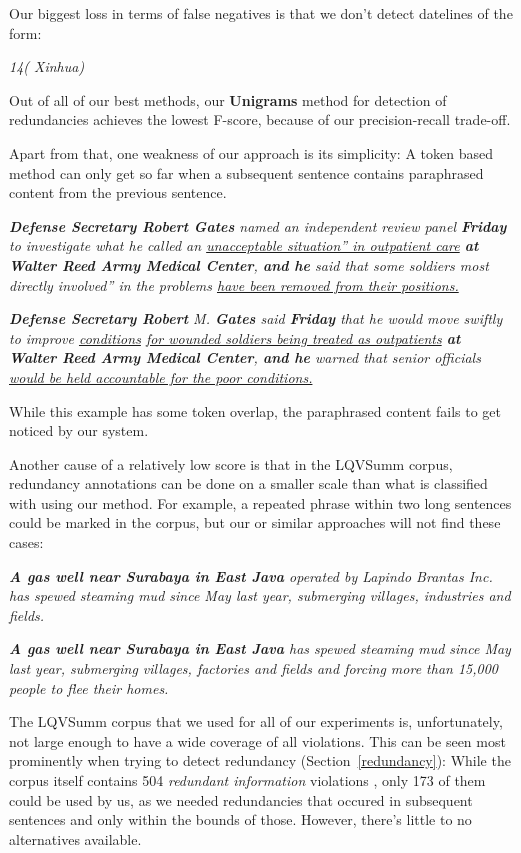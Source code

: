 \documentclass[a4paper,10pt]{scrartcl}
\theoremstyle{style}
\begin{document}

Our biggest loss in terms of false negatives is that we don't detect datelines of the form:

\quad\textit{14( Xinhua)}

Out of all of our best methods, our \textbf{Unigrams} method for detection of redundancies achieves the lowest F-score, because of our precision-recall trade-off.

Apart from that, one weakness of our approach is its simplicity: A token based method can only get so far when a subsequent sentence contains paraphrased content from the previous sentence.

\quad\textit{\textbf{Defense Secretary Robert Gates} named an independent review panel \textbf{Friday} to investigate what he called an \underline{unacceptable situation'' in outpatient care} \textbf{at Walter Reed Army Medical Center}, \textbf{and he} said that some soldiers most directly involved'' in the problems \underline{have been removed from their positions.}}

\quad\textit{\textbf{Defense Secretary Robert} M. \textbf{Gates} said \textbf{Friday} that he would move swiftly to improve \underline{conditions} \underline{for wounded soldiers being treated as outpatients} \textbf{at Walter Reed Army Medical Center}, \textbf{and he} warned that senior officials \underline{would be held accountable for the poor conditions.}}

While this example has some token overlap, the paraphrased content fails to get noticed by our system.

Another cause of a relatively low score is that in the LQVSumm corpus, redundancy annotations can be done on a smaller scale than what is classified with using our method. For example, a repeated phrase within two long sentences could be marked in the corpus, but our or similar approaches will not find these cases:

\quad\textit{\textbf{A gas well near Surabaya in East Java} operated by Lapindo Brantas Inc. has spewed steaming mud since May last year, submerging villages, industries and fields.}

\quad\textit{\textbf{A gas well near Surabaya in East Java} has spewed steaming mud since May last year, submerging villages, factories and fields and forcing more than 15,000 people to flee their homes.}

The LQVSumm corpus that we used for all of our experiments is, unfortunately, not large enough to have a wide coverage of all violations. This can be seen most prominently when trying to detect redundancy (Section~\ref{redundancy}): While the corpus itself contains 504 \textit{redundant information} violations \citep[see][]{friedrichlqvsumm}, only 173 of them could be used by us, as we needed redundancies that occured in subsequent sentences and only within the bounds of those.
However, there's little to no alternatives available.
\end{document}
